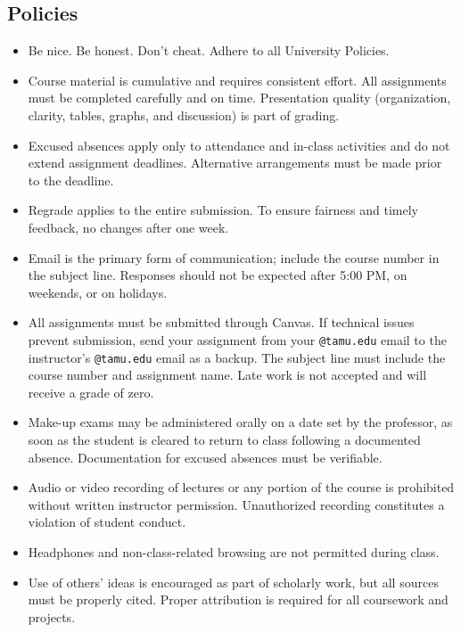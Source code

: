 \documentclass[10pt]{article}
\begin{document}
\subsection*{Policies}
\begin{itemize}[leftmargin=*,nosep]
\item Be nice. Be honest. Don’t cheat. Adhere to all University Policies.
\item Course material is cumulative and requires consistent effort. All assignments must be completed carefully and on time.
      Presentation quality (organization, clarity, tables, graphs, and discussion) is part of grading.
\item Excused absences apply only to attendance and in-class activities and do not extend assignment deadlines.
      Alternative arrangements must be made prior to the deadline.
\item Regrade applies to the entire submission. To ensure fairness and timely feedback, no changes after one week.
\item Email is the primary form of communication; include the course number in the subject line.
      Responses should not be expected after 5:00 PM, on weekends, or on holidays.
\item All assignments must be submitted through Canvas.
      If technical issues prevent submission, send your assignment from your \texttt{@tamu.edu} email to the instructor’s \texttt{@tamu.edu} email as a backup.
      The subject line must include the course number and assignment name.
      Late work is not accepted and will receive a grade of zero.
\item Make-up exams may be administered orally on a date set by the professor, as soon as the student is cleared to return to class following a documented absence.
      Documentation for excused absences must be verifiable.
\item Audio or video recording of lectures or any portion of the course is prohibited without written instructor permission. Unauthorized recording constitutes a violation of student conduct.
\item Headphones and non-class-related browsing are not permitted during class.
\item Use of others’ ideas is encouraged as part of scholarly work, but all sources must be properly cited. Proper attribution is required for all coursework and projects.
\end{itemize}
\end{document}
